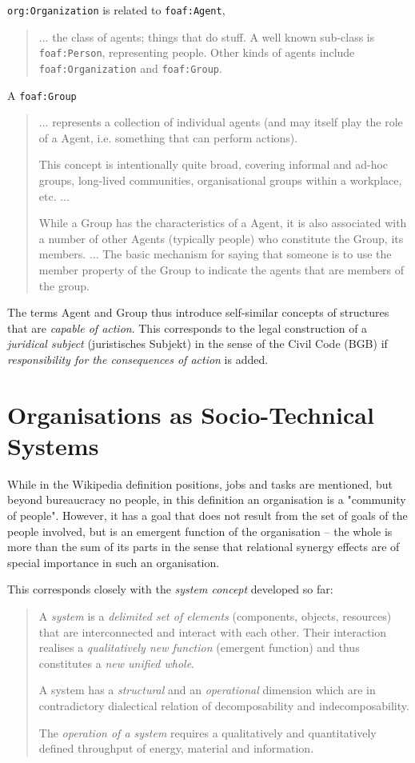 \documentclass[11pt,a4paper]{article}
\begin{document}
\texttt{org:Organization} is related to \texttt{foaf:Agent}, 
\begin{quote}\raggedright
  ... the class of agents; things that do stuff. A well known sub-class is
  \texttt{foaf:Person}, representing people. Other kinds of agents include
  \texttt{foaf:Organization} and \texttt{foaf:Group}. \cite{foaf}
\end{quote}

A \texttt{foaf:Group}
\begin{quote}
  ... represents a collection of individual agents (and may itself play the
  role of a Agent, i.e. something that can perform actions).

  This concept is intentionally quite broad, covering informal and ad-hoc
  groups, long-lived communities, organisational groups within a workplace,
  etc. ...
  
  While a Group has the characteristics of a Agent, it is also associated with
  a number of other Agents (typically people) who constitute the Group, its
  members. ...  The basic mechanism for saying that someone is to use the
  member property of the Group to indicate the agents that are members of the
  group.
\end{quote}
The terms Agent and Group thus introduce self-similar concepts of structures
that are \emph{capable of action}. This corresponds to the legal construction
of a \emph{juridical subject} (juristisches Subjekt) in the sense of the Civil
Code (BGB) if \emph{responsibility for the consequences of action} is added.

\section{Organisations as Socio-Technical Systems}

While in the Wikipedia definition positions, jobs and tasks are mentioned, but
beyond bureaucracy no people, in this definition an organisation is a
"community of people". However, it has a goal that does not result from the
set of goals of the people involved, but is an emergent function of the
organisation -- the whole is more than the sum of its parts in the sense that
relational synergy effects are of special importance in such an organisation.

This corresponds closely with the \emph{system concept} developed so far:
\begin{quote}
  A \emph{system} is a \emph{delimited set of elements} (components, objects,
  resources) that are interconnected and interact with each other. Their
  interaction realises a \emph{qualitatively new function} (emergent function)
  and thus constitutes a \emph{new unified whole}.

  A system has a \emph{structural} and an \emph{operational} dimension which
  are in contradictory dialectical relation of decomposability and
  indecomposability.

  The \emph{operation of a system} requires a qualitatively and quantitatively
  defined throughput of energy, material and information.
\end{quote}
\end{document}
